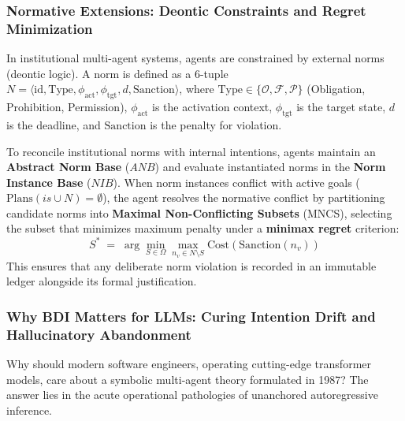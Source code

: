 \documentclass[11pt,a4paper]{article}
\begin{document}
\subsubsection{Normative Extensions: Deontic Constraints and Regret Minimization}

In institutional multi-agent systems, agents are constrained by external norms (deontic logic). A norm is defined as a 6-tuple $N = \langle \mathrm{id}, \mathrm{Type}, \phi_{\text{act}}, \phi_{\text{tgt}}, d, \mathrm{Sanction} \rangle$, where $\mathrm{Type} \in \{\mathcal{O}, \mathcal{F}, \mathcal{P}\}$ (Obligation, Prohibition, Permission), $\phi_{\text{act}}$ is the activation context, $\phi_{\text{tgt}}$ is the target state, $d$ is the deadline, and $\mathrm{Sanction}$ is the penalty for violation.

To reconcile institutional norms with internal intentions, agents maintain an \textbf{Abstract Norm Base} ($ANB$) and evaluate instantiated norms in the \textbf{Norm Instance Base} ($NIB$). When norm instances conflict with active goals ($\mathrm{Plans}(is \cup N) = \emptyset$), the agent resolves the normative conflict by partitioning candidate norms into \textbf{Maximal Non-Conflicting Subsets} (MNCS), selecting the subset that minimizes maximum penalty under a \textbf{minimax regret} criterion:
\begin{equation}
S^* \;=\; \arg\min_{S \in \Omega} \max_{n_v \in N \setminus S} \mathrm{Cost}(\mathrm{Sanction}(n_v))
\end{equation}
This ensures that any deliberate norm violation is recorded in an immutable ledger alongside its formal justification.

\subsubsection{Why BDI Matters for LLMs: Curing Intention Drift and Hallucinatory Abandonment}
\label{sec:why-bdi-matters}

Why should modern software engineers, operating cutting-edge transformer models, care about a symbolic multi-agent theory formulated in 1987? The answer lies in the acute operational pathologies of unanchored autoregressive inference.
\end{document}
